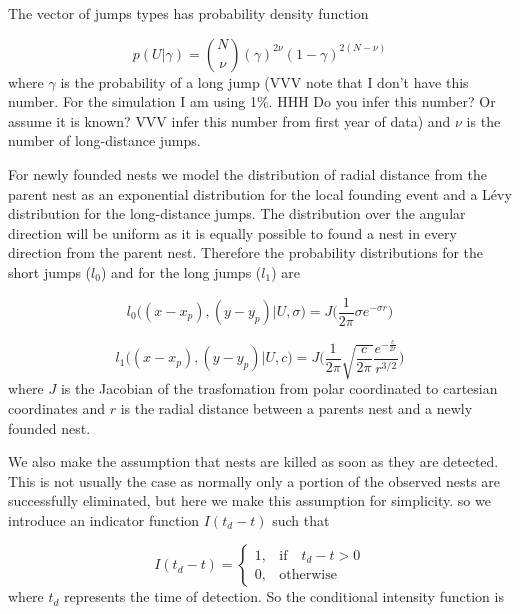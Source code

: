 \documentclass{article}
\begin{document}
The vector of jumps types has probability density function

\begin{equation*}
    p(U| \gamma ) = {N \choose \nu}(\gamma)^{2\nu}(1 - \gamma)^{2(N - \nu)}
\end{equation*}
where $\gamma$ is the probability of a long jump (VVV note that I don't have this number. For the simulation I am using 1\%. HHH Do you infer this number? Or assume it is known? {\color{red} VVV infer this number from first year of data}) and $\nu$ is the number of long-distance jumps.

For newly founded nests we model the distribution of radial distance from the parent nest as an exponential distribution for the local founding event and a L\'evy distribution for the long-distance jumps. The distribution over the angular direction will be uniform as it is equally possible to found a nest in every direction from the parent nest. Therefore the probability distributions for the short jumps ($l_0$) and for the long jumps ($l_1$) are

\begin{equation*}
    l_0\Big((x - x_p), (y - y_p) | U, \sigma \Big)= J \bigg(\frac{1}{2 \pi} \sigma e^{- \sigma r}\bigg)
\end{equation*}

\begin{equation*}
    l_1\Big((x - x_p), (y - y_p) | U, c \Big)= J \bigg(\frac{1}{2 \pi} \sqrt{\frac{c}{2 \pi}} \frac{e^{- \frac{c}{ 2 r}}}{r^{3/2}}\bigg)
\end{equation*}
where $J$ is the Jacobian of the trasfomation from polar coordinated to cartesian coordinates and $r$ is the radial distance between a parents nest and a newly founded nest.

We also make the assumption that nests are killed as soon as they are detected. {\color{red} This is not usually the case as normally only a portion of the observed nests are successfully eliminated, but here we make this assumption for simplicity.} so we introduce an indicator function $I(t_d - t)$ such that

\begin{equation*}
    I (t_d - t) =
    \begin{cases}
        1, & \mbox{if} \quad t_d -  t> 0 \\
        0, & \mbox{otherwise}
    \end{cases}
\end{equation*}
where $t_d$ represents the time of detection. So the conditional intensity function is
\end{document}
